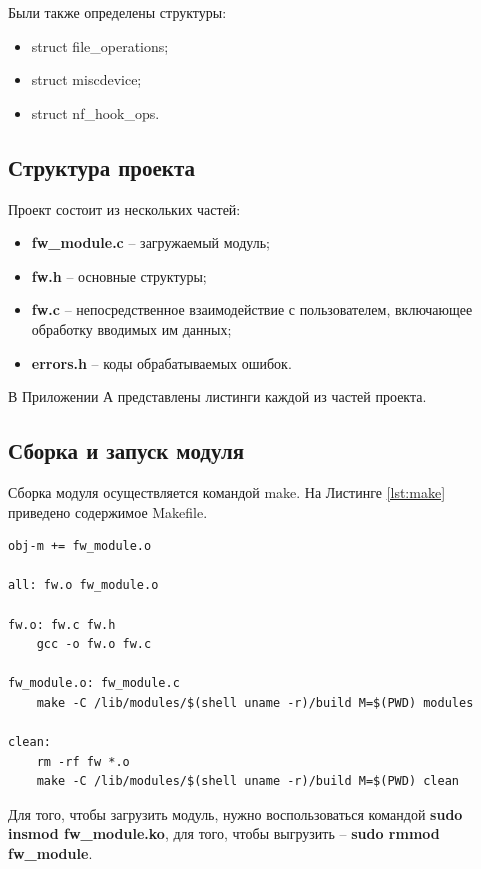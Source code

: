 %
Были также определены структуры:
%
\begin{itemize}
	\item struct file\_operations;
	
	\item struct miscdevice;
	
	\item struct nf\_hook\_ops. \newline
\end{itemize}

\subsection{Структура проекта}
Проект состоит из нескольких частей:
\begin{itemize}
	\item \textbf{fw\_module.c} -- загружаемый модуль;
	
	\item \textbf{fw.h} -- основные структуры;
	
	\item \textbf{fw.c} -- непосредственное взаимодействие с пользователем, включающее обработку вводимых им данных;
	 
	\item \textbf{errors.h} -- коды обрабатываемых ошибок.
\end{itemize}
%
В Приложении А представлены листинги каждой из частей проекта. \newline
%

\subsection{Сборка и запуск модуля}
Сборка модуля осуществляется командой make. На Листинге \ref{lst:make} приведено содержимое Makefile.

\begin{lstlisting}[caption = {Makefile}, label=lst:make]
obj-m += fw_module.o

all: fw.o fw_module.o

fw.o: fw.c fw.h
	gcc -o fw.o fw.c	

fw_module.o: fw_module.c
	make -C /lib/modules/$(shell uname -r)/build M=$(PWD) modules

clean:
	rm -rf fw *.o
	make -C /lib/modules/$(shell uname -r)/build M=$(PWD) clean
\end{lstlisting}

Для того, чтобы загрузить модуль, нужно воспользоваться командой \textbf{sudo insmod fw\_module.ko}, для того, чтобы выгрузить -- \textbf{sudo rmmod fw\_module}. \newline

